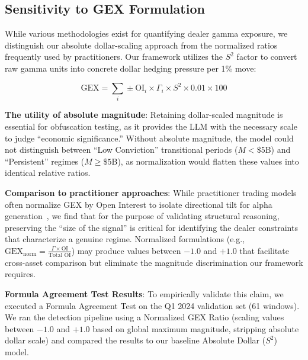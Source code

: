 \subsection{Sensitivity to GEX Formulation}

\vspace{0.2cm}

While various methodologies exist for quantifying dealer gamma exposure, we distinguish our absolute dollar-scaling approach from the normalized ratios frequently used by practitioners. Our framework utilizes the $S^2$ factor to convert raw gamma units into concrete dollar hedging pressure per 1\% move:

\begin{equation}
\text{GEX} = \sum_i \pm \text{OI}_i \times \Gamma_i \times S^2 \times 0.01 \times 100
\end{equation}

\vspace{0.2cm}

\noindent\textbf{The utility of absolute magnitude}: Retaining dollar-scaled magnitude is essential for obfuscation testing, as it provides the LLM with the necessary scale to judge ``economic significance.'' Without absolute magnitude, the model could not distinguish between ``Low Conviction'' transitional periods ($M < \$5$B) and ``Persistent'' regimes ($M \geq \$5$B), as normalization would flatten these values into identical relative ratios.

\vspace{0.2cm}

\noindent\textbf{Comparison to practitioner approaches}: While practitioner trading models often normalize GEX by Open Interest to isolate directional tilt for alpha generation~\cite{anderegg2022impact,spotgamma2021}, we find that for the purpose of validating structural reasoning, preserving the ``size of the signal'' is critical for identifying the dealer constraints that characterize a genuine regime. Normalized formulations (e.g., $\text{GEX}_{\text{norm}} = \frac{\Gamma \times \text{OI}}{\text{Total OI}}$) may produce values between $-1.0$ and $+1.0$ that facilitate cross-asset comparison but eliminate the magnitude discrimination our framework requires.

\vspace{0.2cm}

\noindent\textbf{Formula Agreement Test Results}: To empirically validate this claim, we executed a Formula Agreement Test on the Q1 2024 validation set (61 windows). We ran the detection pipeline using a Normalized GEX Ratio (scaling values between $-1.0$ and $+1.0$ based on global maximum magnitude, stripping absolute dollar scale) and compared the results to our baseline Absolute Dollar ($S^2$) model.

